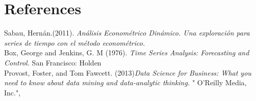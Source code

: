 \documentclass[a4paper, 11pt]{article}
\begin{document}
\newpage
\section*{References}
\begin{hangparas}{.25in}{1}
Sabau, Hernán.(2011). \textit{Análisis Econométrico Dinámico. Una exploración para series de tiempo con el método econométrico.}\\
Box, George and Jenkins, G. M (1976). \textit{Time Series Analysis: Forecasting and Control.} San Francisco: Holden\\

Provost, Foster, and Tom Fawcett. (2013)\textit{Data Science for Business: What you need to know about data mining and data-analytic thinking.} " O'Reilly Media, Inc.",\\
\end{hangparas}
\end{document}
